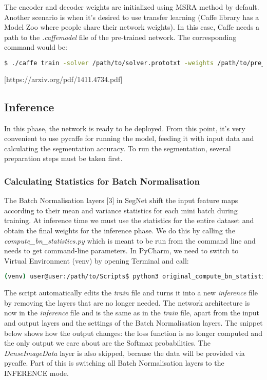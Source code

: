 The encoder and decoder weights are initialized using MSRA method by default. Another scenario is when it's desired to use transfer learning (Caffe library has a Model Zoo where people share their network weights). In this case, Caffe needs a path to the \textit{.caffemodel} file of the pre-trained network. The corresponding command would be:

\begin{lstlisting}[language=bash]
$ ./caffe train -solver /path/to/solver.prototxt -weights /path/to/pre_trained_weights.caffemodel
\end{lstlisting}

 [https://arxiv.org/pdf/1411.4734.pdf]

\subsection{Inference}

In this phase, the network is ready to be deployed. From this point, it's very convenient to use pycaffe for running the model, feeding it with input data and calculating the segmentation accuracy. To run the segmentation, several preparation steps must be taken first.

\subsubsection{Calculating Statistics for Batch Normalisation}
The Batch Normalisation layers [3] in SegNet shift the input feature maps according to their mean and variance statistics for each mini batch during training. At inference time we must use the statistics for the entire dataset and obtain the final weights for the inference phase. We do this by calling the \textit{compute\_bn\_statistics.py} which is meant to be run from the command line and needs to get command-line parameters. In PyCharm, we need to switch to Virtual Environment (venv) by opening Terminal and call:

\begin{lstlisting}[language=bash]
(venv) user@user:/path/to/Scripts$ python3 original_compute_bn_statistics.py /path/to/train.prototxt /path/to/snap_iter_XY.caffemodel /path/to/inference_folder
\end{lstlisting}

The script automatically edits the \textit{train} file and turns it into a new \textit{inference} file by removing the layers that are no longer needed. The network architecture is now in the \textit{inference} file and is the same as in the \textit{train} file, apart from the input and output layers and the settings of the Batch Normalisation layers. The snippet below shows how the output changes: the loss function is no longer computed and the only output we care about are the Softmax probabilities. The \textit{DenseImageData} layer is also skipped, because the data will be provided via pycaffe. Part of this is switching all Batch Normalisation layers to the INFERENCE mode.

